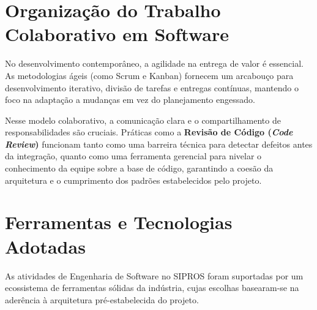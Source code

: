 \section{Organização do Trabalho Colaborativo em Software}

No desenvolvimento contemporâneo, a agilidade na entrega de valor é essencial. As metodologias ágeis (como Scrum e Kanban) \cite{scrum_guide} fornecem um arcabouço para desenvolvimento iterativo, divisão de tarefas e entregas contínuas, mantendo o foco na adaptação a mudanças em vez do planejamento engessado.

Nesse modelo colaborativo, a comunicação clara e o compartilhamento de responsabilidades são cruciais. Práticas como a \textbf{Revisão de Código (\textit{Code Review})} funcionam tanto como uma barreira técnica para detectar defeitos antes da integração, quanto como uma ferramenta gerencial para nivelar o conhecimento da equipe sobre a base de código, garantindo a coesão da arquitetura e o cumprimento dos padrões estabelecidos pelo projeto.

\section{Ferramentas e Tecnologias Adotadas}

As atividades de Engenharia de Software no SIPROS foram suportadas por um ecossistema de ferramentas sólidas da indústria, cujas escolhas basearam-se na aderência à arquitetura pré-estabelecida do projeto. 

